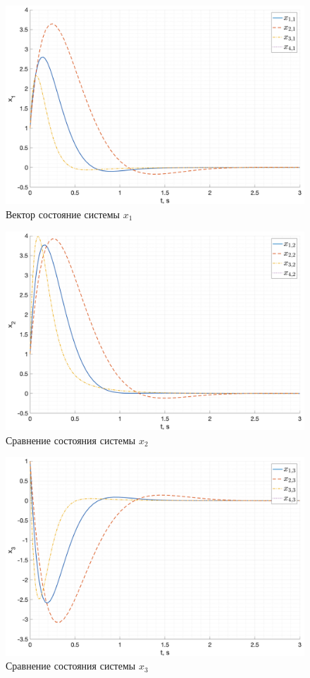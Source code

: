\begin{figure}[ht!]
    \centering
    \includegraphics[width=\textwidth]{media/plots/lqr_task1/x1_cmp.png}
    \caption{Вектор состояние системы $x_1$}
    \label{fig:task1_x1_cmp_1}
\end{figure}
\begin{figure}[ht!]
    \centering
    \includegraphics[width=\textwidth]{media/plots/lqr_task1/x2_cmp.png}
    \caption{Сравнение состояния системы $x_2$}
    \label{fig:task1_x2_cmp_1}
\end{figure}
\begin{figure}[ht!]
    \centering
    \includegraphics[width=\textwidth]{media/plots/lqr_task1/x3_cmp.png}
    \caption{Сравнение состояния системы $x_3$}
    \label{fig:task1_x3_cmp_1}
\end{figure}    
\FloatBarrier
